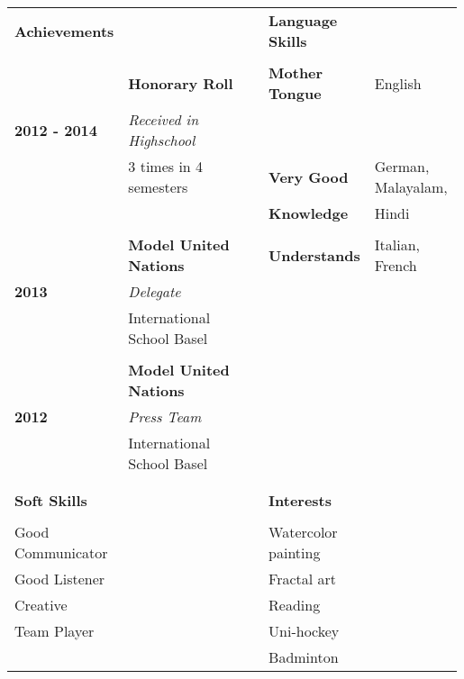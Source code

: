 \noindent
\begin{table}[h]
    \begin{tabular*}{\textwidth}{@{}p{0.25\linewidth}@{}p{0.28\linewidth}@{}p{0.052\linewidth} @{}p{0.20\linewidth}@{}p{0.204\linewidth}}
        {\large\color{mediumpersianblue}\textbf{Achievements}} & &  & {\large\color{mediumpersianblue}\textbf{Language Skills}} & \\ \arrayrulecolor{gray}\cline{1-2}\cline{4-5}
        \vspace{-0.2cm}
        & & & & \\
        & \textbf{Honorary Roll} & & \textcolor[gray]{0.5}{\textbf{Mother Tongue}} & English \\
        \textcolor[gray]{0.5}{\textbf{2012 - 2014}} & \textsl{\small Received in Highschool} & & & \\
        & {\small 3 times in 4 semesters} & & \textcolor[gray]{0.5}{\textbf{Very Good}} & German, Malayalam, \\
        & & & \textcolor[gray]{0.5}{\textbf{Knowledge}} & Hindi \\
        & & & & \\
        & \textbf{Model United Nations} & & \textcolor[gray]{0.5}{\textbf{Understands}} & Italian, French\\
        \textcolor[gray]{0.5}{\textbf{2013}} & \textsl{\small Delegate} & & \\
        & {\small International School Basel} & & & \\
        & & & & \\
        & \textbf{Model United Nations} & & & \\
        \textcolor[gray]{0.5}{\textbf{2012}} & \textsl{\small Press Team} & & & \\
        & {\small International School Basel} & & & \\
        & & & & \\
        & & & & \\

        {\large\color{mediumpersianblue}\textbf{Soft Skills}} &  & & {\large\color{mediumpersianblue}\textbf{Interests}} & \\ \arrayrulecolor{gray}\cline{1-2}\cline{4-5}
        \vspace{-0.2cm}
        & & & & \\
        Good Communicator & & & Watercolor painting & \\
        Good Listener & & & Fractal art & \\
        Creative & & & Reading & \\
        Team Player & & & Uni-hockey & \\
        & & & Badminton & \\

    \end{tabular*}
\end{table}
